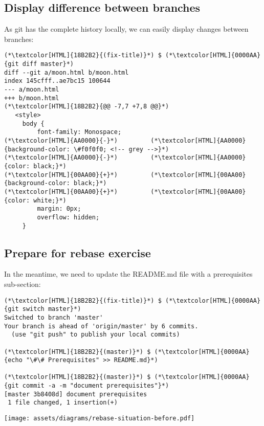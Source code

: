 \subsection{Display difference between branches}
\begin{frame}[fragile]
  \subslidetitle

  As git has the complete history locally, we can easily display changes between branches:

  \begin{lstlisting}
(*\textcolor[HTML]{18B2B2}{(fix-title)}*) $ (*\textcolor[HTML]{0000AA}{git diff master}*)
diff --git a/moon.html b/moon.html
index 145cfff..ae7bc15 100644
--- a/moon.html
+++ b/moon.html
(*\textcolor[HTML]{18B2B2}{@@ -7,7 +7,8 @@}*)
   <style>
     body {
         font-family: Monospace;
(*\textcolor[HTML]{AA0000}{-}*)         (*\textcolor[HTML]{AA0000}{background-color: \#f0f0f0; <!-- grey -->}*)
(*\textcolor[HTML]{AA0000}{-}*)         (*\textcolor[HTML]{AA0000}{color: black;}*)
(*\textcolor[HTML]{00AA00}{+}*)         (*\textcolor[HTML]{00AA00}{background-color: black;}*)
(*\textcolor[HTML]{00AA00}{+}*)         (*\textcolor[HTML]{00AA00}{color: white;}*)
         margin: 0px;
         overflow: hidden;
     }
\end{lstlisting}
\end{frame}

\subsection{Prepare for rebase exercise}
\begin{frame}[fragile]
  \subslidetitle

  In the meantime, we need to update the README.md file with a prerequisites sub-section:
  \begin{lstlisting}
(*\textcolor[HTML]{18B2B2}{(fix-title)}*) $ (*\textcolor[HTML]{0000AA}{git switch master}*)
Switched to branch 'master'
Your branch is ahead of 'origin/master' by 6 commits.
  (use "git push" to publish your local commits)

(*\textcolor[HTML]{18B2B2}{(master)}*) $ (*\textcolor[HTML]{0000AA}{echo "\#\# Prerequisites" >> README.md}*)

(*\textcolor[HTML]{18B2B2}{(master)}*) $ (*\textcolor[HTML]{0000AA}{git commit -a -m "document prerequisites"}*)
[master 3b8408d] document prerequisites
 1 file changed, 1 insertion(+)
\end{lstlisting}

  \centerline{\texttt{[image: assets/diagrams/rebase-situation-before.pdf]}}

\end{frame}

